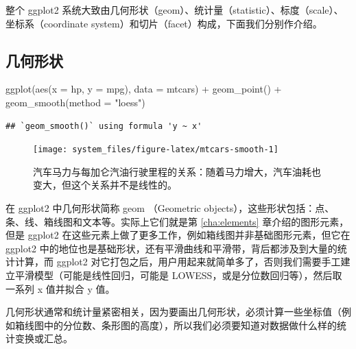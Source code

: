 \documentclass[
  b5paper,
  UTF8,twoside]{book}
\newenvironment{Shaded}{\begin{snugshade}}{\end{snugshade}}
\newcommand{\AttributeTok}[1]{\textcolor[rgb]{0.77,0.63,0.00}{#1}}
\newcommand{\FunctionTok}[1]{\textcolor[rgb]{0.00,0.00,0.00}{#1}}
\newcommand{\NormalTok}[1]{#1}
\newcommand{\SpecialCharTok}[1]{\textcolor[rgb]{0.00,0.00,0.00}{#1}}
\newcommand{\StringTok}[1]{\textcolor[rgb]{0.31,0.60,0.02}{#1}}
\begin{document}
整个 ggplot2 系统大致由几何形状（geom）、统计量（statistic）、标度（scale）、坐标系（coordinate system）和切片（facet）构成，下面我们分别作介绍。

\hypertarget{ux51e0ux4f55ux5f62ux72b6}{%
\subsection{几何形状}\label{ux51e0ux4f55ux5f62ux72b6}}

\begin{Shaded}
\begin{Highlighting}[]
\FunctionTok{ggplot}\NormalTok{(}\FunctionTok{aes}\NormalTok{(}\AttributeTok{x =}\NormalTok{ hp, }\AttributeTok{y =}\NormalTok{ mpg), }\AttributeTok{data =}\NormalTok{ mtcars) }\SpecialCharTok{+}
  \FunctionTok{geom\_point}\NormalTok{() }\SpecialCharTok{+}
  \FunctionTok{geom\_smooth}\NormalTok{(}\AttributeTok{method =} \StringTok{"loess"}\NormalTok{)}
\end{Highlighting}
\end{Shaded}

\begin{verbatim}
## `geom_smooth()` using formula 'y ~ x'
\end{verbatim}

\begin{figure}

{\centering \texttt{[image: system\_files/figure-latex/mtcars-smooth-1]} 

}

\caption[汽车马力与每加仑汽油行驶里程的关系]{汽车马力与每加仑汽油行驶里程的关系：随着马力增大，汽车油耗也变大，但这个关系并不是线性的。}\label{fig:mtcars-smooth}
\end{figure}





在 ggplot2 中几何形状简称 geom （Geometric objects），这些形状包括：点、条、线、箱线图和文本等。实际上它们就是第 \ref{cha:elements} 章介绍的图形元素，但是 ggplot2 在这些元素上做了更多工作，例如箱线图并非基础图形元素，但它在 ggplot2 中的地位也是基础形状，还有平滑曲线和平滑带，背后都涉及到大量的统计计算，而 ggplot2 对它打包之后，用户用起来就简单多了，否则我们需要手工建立平滑模型（可能是线性回归，可能是 LOWESS，或是分位数回归等），然后取一系列 x 值并拟合 y 值。

几何形状通常和统计量紧密相关，因为要画出几何形状，必须计算一些坐标值（例如箱线图中的分位数、条形图的高度），所以我们必须要知道对数据做什么样的统计变换或汇总。
\end{document}
